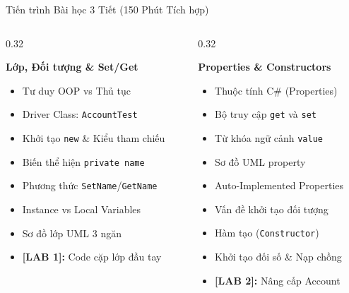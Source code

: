 \documentclass[aspectratio=169, 10pt]{beamer}
\begin{document}
\begin{frame}{Tiến trình Bài học 3 Tiết (150 Phút Tích hợp)}
  \begin{columns}[T]
    \begin{column}{0.32\textwidth}
      \begin{tcolorbox}[colback=UniNavy!10,colframe=UniNavy,title=\textbf{TIẾT 1 (50')},fonttitle=\small\bfseries]
        \textbf{Lớp, Đối tượng \& Set/Get}
        \begin{itemize}\footnotesize
          \item Tư duy OOP vs Thủ tục
          \item Driver Class: \texttt{AccountTest}
          \item Khởi tạo \texttt{new} \& Kiểu tham chiếu
          \item Biến thể hiện \texttt{private name}
          \item Phương thức \texttt{SetName}/\texttt{GetName}
          \item Instance vs Local Variables
          \item Sơ đồ lớp UML 3 ngăn
          \item \textbf{[LAB 1]:} Code cặp lớp đầu tay
        \end{itemize}
      \end{tcolorbox}
    \end{column}

    \begin{column}{0.32\textwidth}
      \begin{tcolorbox}[colback=CSharpPurple!10,colframe=CSharpPurple,title=\textbf{TIẾT 2 (50')},fonttitle=\small\bfseries]
        \textbf{Properties \& Constructors}
        \begin{itemize}\footnotesize
          \item Thuộc tính C\# (Properties)
          \item Bộ truy cập \texttt{get} và \texttt{set}
          \item Từ khóa ngữ cảnh \texttt{value}
          \item Sơ đồ UML \guillemotleft property\guillemotright
          \item Auto-Implemented Properties
          \item Vấn đề khởi tạo đối tượng
          \item Hàm tạo (\texttt{Constructor})
          \item Khởi tạo đối số \& Nạp chồng
          \item \textbf{[LAB 2]:} Nâng cấp Account
        \end{itemize}
      \end{tcolorbox}
    \end{column}


\end{columns}
\end{frame}
\end{document}
